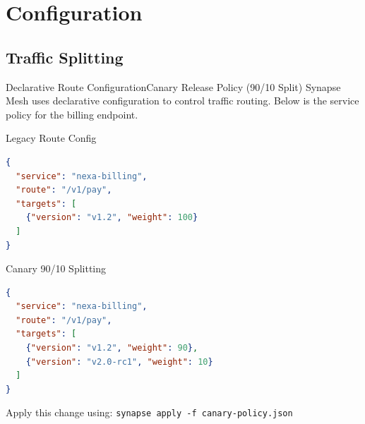 \section{Configuration}
\subsection{Traffic Splitting}

\begin{frame}[fragile]{Declarative Route Configuration}{Canary Release Policy (90/10 Split)}
  Synapse Mesh uses declarative configuration to control traffic routing. Below is the service policy for the billing endpoint.
  
  \vspace{0.2cm}
  \begin{minipage}[t]{0.48\textwidth}
    \begin{codebox}{Legacy Route Config}
\begin{lstlisting}[language=json]
{
  "service": "nexa-billing",
  "route": "/v1/pay",
  "targets": [
    {"version": "v1.2", "weight": 100}
  ]
}
\end{lstlisting}
    \end{codebox}
  \end{minipage}
  \hfill
  \begin{minipage}[t]{0.48\textwidth}
    \begin{codebox}{Canary 90/10 Splitting}
\begin{lstlisting}[language=json]
{
  "service": "nexa-billing",
  "route": "/v1/pay",
  "targets": [
    {"version": "v1.2", "weight": 90},
    {"version": "v2.0-rc1", "weight": 10}
  ]
}
\end{lstlisting}
    \end{codebox}
  \end{minipage}
  
  \vspace{0.3cm}
  Apply this change using: \texttt{synapse apply -f canary-policy.json}
\end{frame}

